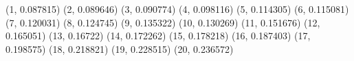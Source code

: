 (1, 0.087815) (2, 0.089646) (3, 0.090774) (4, 0.098116) (5, 0.114305) (6, 0.115081) (7, 0.120031) (8, 0.124745) (9, 0.135322) (10, 0.130269) (11, 0.151676) (12, 0.165051) (13, 0.16722) (14, 0.172262) (15, 0.178218) (16, 0.187403) (17, 0.198575) (18, 0.218821) (19, 0.228515) (20, 0.236572) 